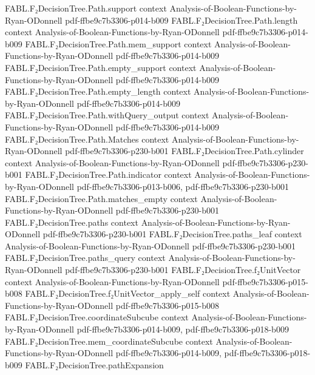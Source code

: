 \begin{theorem}
\proofstep
  {FABL.F₂DecisionTree.Path.support}
  {context}
  {Analysis-of-Boolean-Functions-by-Ryan-ODonnell}
  {pdf-ffbe9c7b3306-p014-b009}
\proofstep
  {FABL.F₂DecisionTree.Path.length}
  {context}
  {Analysis-of-Boolean-Functions-by-Ryan-ODonnell}
  {pdf-ffbe9c7b3306-p014-b009}
\proofstep
  {FABL.F₂DecisionTree.Path.mem_support}
  {context}
  {Analysis-of-Boolean-Functions-by-Ryan-ODonnell}
  {pdf-ffbe9c7b3306-p014-b009}
\proofstep
  {FABL.F₂DecisionTree.Path.empty_support}
  {context}
  {Analysis-of-Boolean-Functions-by-Ryan-ODonnell}
  {pdf-ffbe9c7b3306-p014-b009}
\proofstep
  {FABL.F₂DecisionTree.Path.empty_length}
  {context}
  {Analysis-of-Boolean-Functions-by-Ryan-ODonnell}
  {pdf-ffbe9c7b3306-p014-b009}
\proofstep
  {FABL.F₂DecisionTree.Path.withQuery_output}
  {context}
  {Analysis-of-Boolean-Functions-by-Ryan-ODonnell}
  {pdf-ffbe9c7b3306-p014-b009}
\proofstep
  {FABL.F₂DecisionTree.Path.Matches}
  {context}
  {Analysis-of-Boolean-Functions-by-Ryan-ODonnell}
  {pdf-ffbe9c7b3306-p230-b001}
\proofstep
  {FABL.F₂DecisionTree.Path.cylinder}
  {context}
  {Analysis-of-Boolean-Functions-by-Ryan-ODonnell}
  {pdf-ffbe9c7b3306-p230-b001}
\proofstep
  {FABL.F₂DecisionTree.Path.indicator}
  {context}
  {Analysis-of-Boolean-Functions-by-Ryan-ODonnell}
  {pdf-ffbe9c7b3306-p013-b006,
    pdf-ffbe9c7b3306-p230-b001}
\proofstep
  {FABL.F₂DecisionTree.Path.matches_empty}
  {context}
  {Analysis-of-Boolean-Functions-by-Ryan-ODonnell}
  {pdf-ffbe9c7b3306-p230-b001}
\proofstep
  {FABL.F₂DecisionTree.paths}
  {context}
  {Analysis-of-Boolean-Functions-by-Ryan-ODonnell}
  {pdf-ffbe9c7b3306-p230-b001}
\proofstep
  {FABL.F₂DecisionTree.paths_leaf}
  {context}
  {Analysis-of-Boolean-Functions-by-Ryan-ODonnell}
  {pdf-ffbe9c7b3306-p230-b001}
\proofstep
  {FABL.F₂DecisionTree.paths_query}
  {context}
  {Analysis-of-Boolean-Functions-by-Ryan-ODonnell}
  {pdf-ffbe9c7b3306-p230-b001}
\proofstep
  {FABL.F₂DecisionTree.f₂UnitVector}
  {context}
  {Analysis-of-Boolean-Functions-by-Ryan-ODonnell}
  {pdf-ffbe9c7b3306-p015-b008}
\proofstep
  {FABL.F₂DecisionTree.f₂UnitVector_apply_self}
  {context}
  {Analysis-of-Boolean-Functions-by-Ryan-ODonnell}
  {pdf-ffbe9c7b3306-p015-b008}
\proofstep
  {FABL.F₂DecisionTree.coordinateSubcube}
  {context}
  {Analysis-of-Boolean-Functions-by-Ryan-ODonnell}
  {pdf-ffbe9c7b3306-p014-b009,
    pdf-ffbe9c7b3306-p018-b009}
\proofstep
  {FABL.F₂DecisionTree.mem_coordinateSubcube}
  {context}
  {Analysis-of-Boolean-Functions-by-Ryan-ODonnell}
  {pdf-ffbe9c7b3306-p014-b009,
    pdf-ffbe9c7b3306-p018-b009}
\proofstep
  {FABL.F₂DecisionTree.pathExpansion}

\end{theorem}
